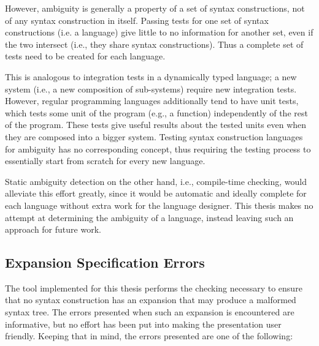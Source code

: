 \documentclass{kththesis}
\begin{document}
However, ambiguity is generally a property of a set of syntax constructions, not of any syntax construction in itself. Passing tests for one set of syntax constructions (i.e. a language) give little to no information for another set, even if the two intersect (i.e., they share syntax constructions). Thus a complete set of tests need to be created for each language.

This is analogous to integration tests in a dynamically typed language; a new system (i.e., a new composition of sub-systems) require new integration tests. However, regular programming languages additionally tend to have unit tests, which tests some unit of the program (e.g., a function) independently of the rest of the program. These tests give useful results about the tested units even when they are composed into a bigger system. Testing syntax construction languages for ambiguity has no corresponding concept, thus requiring the testing process to essentially start from scratch for every new language.

Static ambiguity detection on the other hand, i.e., compile-time checking, would alleviate this effort greatly, since it would be automatic and ideally complete for each language without extra work for the language designer. This thesis makes no attempt at determining the ambiguity of a language, instead leaving such an approach for future work.

\subsection{Expansion Specification Errors}

The tool implemented for this thesis performs the checking necessary to ensure that no syntax construction has an expansion that may produce a malformed syntax tree. The errors presented when such an expansion is encountered are informative, but no effort has been put into making the presentation user friendly. Keeping that in mind, the errors presented are one of the following:
\end{document}
